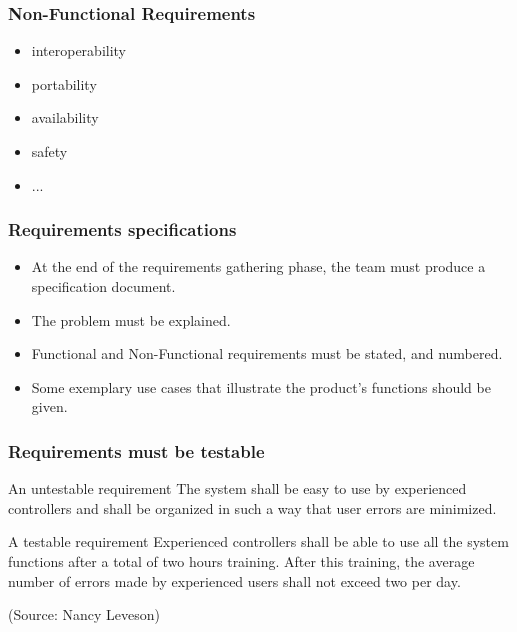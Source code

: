 \documentclass[10pt]{beamer}
\begin{document}
\begin{frame}[fragile]
  \frametitle{Non-Functional Requirements}
  \begin{itemize}
  \item interoperability
  \item portability
  \item availability
  \item safety
  \item ...
  \end{itemize}
\end{frame}

\begin{frame}[fragile]
\frametitle{Requirements specifications}
\begin{itemize}
\item At the end of the requirements gathering phase, the team must produce a
  specification document.
\item The problem must be explained.
\item Functional and Non-Functional requirements must be stated, and numbered.
\item Some exemplary use cases that illustrate the product's functions should be
  given.
\end{itemize}
\end{frame}

\begin{frame}[fragile]
  \frametitle{Requirements must be testable}
  \begin{alertblock}{An untestable requirement}
    The system shall be easy to use by experienced
    controllers and shall be organized in such a way
    that user errors are minimized.
  \end{alertblock}
  \begin{exampleblock}{A testable requirement}
    Experienced controllers shall be able to use all
    the system functions after a total of two hours
    training. After this training, the average number
    of errors made by experienced users shall not
    exceed two per day.
  \end{exampleblock}
  \tiny (Source: Nancy Leveson)
\end{frame}
\end{document}
